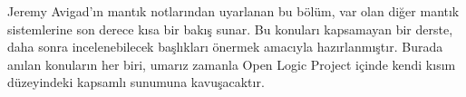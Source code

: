 


\begin{editorial}
  Jeremy Avigad'ın mantık notlarından uyarlanan bu bölüm, var olan diğer
  mantık sistemlerine son derece kısa bir bakış sunar. Bu konuları kapsamayan
  bir derste, daha sonra incelenebilecek başlıkları önermek amacıyla
  hazırlanmıştır. Burada anılan konuların her biri, umarız zamanla Open Logic
  Project içinde kendi kısım düzeyindeki kapsamlı sunumuna kavuşacaktır.
\end{editorial}








\OLEndChapterHook

